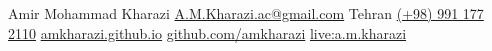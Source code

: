 \documentclass[lighthipster]{simplehipstercv}
\newlength{\rightcolwidth}
\begin{document}
\begin{paracol}{2}
\vfill{} %

\setlength{\parindent}{0pt}
\begin{minipage}[t]{\rightcolwidth}
\begin{center}\fontfamily{\sfdefault}\selectfont \color{black!70}
{\small 
	Amir Mohammad Kharazi
	  \href{mailto:A.M.Kharazi.ac@gmail.com}{A.M.Kharazi.ac@gmail.com} 
	  Tehran 
	   \href{tel:+989911772110}{(+98) 991 177 2110} 
	   \newline
	    \href{https://amkharazi.github.io/}{amkharazi.github.io}
	    \href{https://github.com/amkharazi}{github.com/amkharazi}
	    \href{live:a.m.kharazi}{live:a.m.kharazi}
	    
}
\end{center}
\end{minipage}

\end{paracol}
\end{document}

